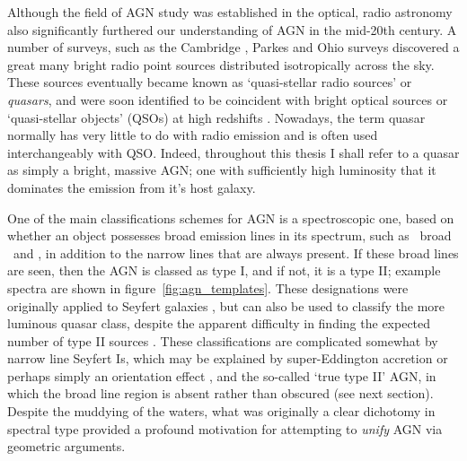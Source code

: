 Although the field of AGN study was established in the optical, 
radio astronomy also significantly furthered our understanding of AGN
in the mid-20th century. A number of surveys, such as the Cambridge \citep{edge1959}, 
Parkes \citep{ekers1969} and Ohio \citep{ehman1970} surveys discovered a great many 
bright radio point sources distributed isotropically across the sky.
These sources eventually became known as `quasi-stellar radio sources'
or {\em quasars}, and were soon identified to be coincident with bright optical
sources or `quasi-stellar objects' (QSOs) at high 
redshifts \citep{schmidt1963,schmidt1965a,schmidt1965b}.
Nowadays, the term quasar normally has very little to do with 
radio emission and is often used interchangeably with QSO. 
Indeed, throughout this thesis I shall refer to a quasar as simply a bright, 
massive AGN; one with sufficiently high luminosity that it dominates the emission 
from it's host galaxy.

One of the main classifications schemes for AGN is a spectroscopic one, based on 
whether an object possesses broad emission lines in its spectrum, such as \civ\, broad \hb\ and
\la, in addition to the narrow lines that are always present. 
If these broad lines are seen, then the AGN is classed as type I, and if not, it is a type II; 
example spectra are shown in figure~\ref{fig:agn_templates}.
These designations were originally applied to Seyfert galaxies \citep{seyfert1943}, 
but can also be used to classify the more luminous quasar class, despite the apparent
difficulty in finding the expected number of type II sources \citep{zakamska2003}. 
These classifications are complicated somewhat by narrow line Seyfert Is, which
may be explained by super-Eddington accretion \citep{done2015} 
or perhaps simply an orientation effect \citep{baldi2016},
and the so-called `true type II' AGN, in which the broad line region is absent 
\citep{tran2001,shi2010} rather than obscured (see next section).
Despite the muddying of the waters, what was originally a clear dichotomy in spectral type provided a 
profound motivation for attempting to {\em unify} AGN via geometric arguments.




